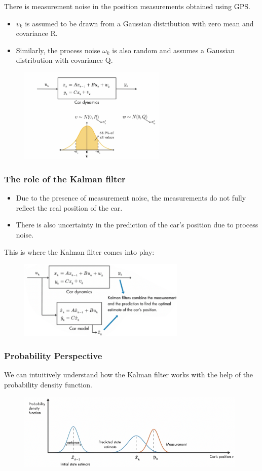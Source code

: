 \documentclass{beamer}
\begin{document}
\begin{frame}
	There is measurement noise  in the position measurements obtained using GPS.
	
	\begin{itemize}
		\item $v_k $ is assumed to be drawn from a Gaussian distribution with zero mean and covariance R.
		\item Similarly, the process noise $\omega_k $ is also random and assumes a Gaussian distribution with covariance Q. 
	\end{itemize}
	\begin{figure}
		\centering
		\includegraphics[width=7cm]{car_noise.png}
	\end{figure}
\end{frame}

\begin{frame}
	\frametitle{The role of the Kalman filter}
		\begin{itemize}
			\item Due to the presence of measurement noise, the measurements do not fully reflect the real position of the car.
			\item There is also uncertainty in the prediction of the car's position due to process noise.
		\end{itemize}
    This is where the Kalman filter comes into play:
	\begin{figure}
		\centering
		\includegraphics[width=8cm]{car_kf.png}
	\end{figure}
\end{frame}

\begin{frame}
	\frametitle{Probability Perspective}
	We can intuitively understand how the Kalman filter works with the help of the probability density function.
	\begin{figure}
		\centering
		\includegraphics[width=11cm]{car_kf_relation.png}
	\end{figure}
\end{frame}
\end{document}
